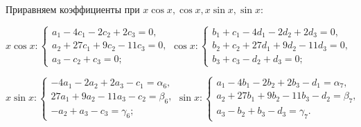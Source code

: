\documentclass[11pt]{article}
\begin{document}
{\smallskip
Приравняем коэффициенты при $x \cos x, \cos x, x \sin x, \sin x$:

$x \cos x: \begin{cases} 
a_1 - 4c_1 - 2c_2 + 2c_3 = 0, \\ 
a_2 + 27c_1 + 9c_2 - 11c_3 = 0, \\ 
a_3 - c_2 + c_3 = 0; 
\end{cases}
\cos x: \begin{cases} 
b_1 + c_1 - 4d_1 - 2d_2 + 2d_3 = 0, \\ 
b_2 + c_2 + 27d_1 + 9d_2 - 11d_3 = 0, \\ 
b_3 + c_3 - d_2 + d_3 = 0; 
\end{cases}$

\hspace{-1em}
$x \sin x: \begin{cases} 
-4a_1 - 2a_2 + 2a_3 - c_1 = \alpha_6, \\ 
27a_1 + 9a_2 - 11a_3 - c_2 = \beta_6, \\ 
-a_2 + a_3 - c_3 = \gamma_6; 
\end{cases}
\sin x: \begin{cases} 
a_1 - 4b_1 - 2b_2 + 2b_3 - d_1 = \alpha_7, \\ 
a_2 + 27b_1 + 9b_2 - 11b_3 - d_2 = \beta_7, \\ 
a_3 - b_2 + b_3 - d_3 = \gamma_7.
\end{cases}$

}
\end{document}
